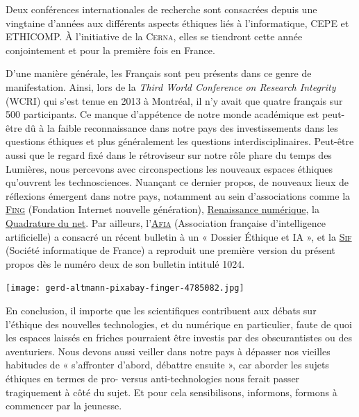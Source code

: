 Deux conférences internationales de recherche sont consacrées depuis une vingtaine d’années aux différents aspects éthiques liés à l’informatique, CEPE et ETHICOMP. À l’initiative de la \textsc{Cerna}, elles se tiendront cette année conjointement et pour la première fois en France.

D’une manière générale, les Français sont peu présents dans ce genre de manifestation. Ainsi, lors de la \textit{Third World Conference on Research Integrity} (WCRI) qui s’est tenue en 2013 à Montréal, il n’y avait que quatre français sur 500 participants. Ce manque d’appétence de notre monde académique est peut-être dû à la faible reconnaissance dans notre pays des investissements dans les questions éthiques et plus généralement les questions interdisciplinaires. Peut-être aussi que le regard fixé dans le rétroviseur sur notre rôle phare du temps des Lumières, nous percevons avec circonspections les nouveaux espaces éthiques qu’ouvrent les technosciences. Nuançant ce dernier propos, de nouveaux lieux de réflexions émergent dans notre pays, notamment au sein d’associations comme la \href{https://fing.org/}{\textsc{Fing}} (Fondation Internet nouvelle génération), \href{https://www.renaissancenumerique.org/}{Renaissance numérique}, la \href{https://www.laquadrature.net/}{Quadrature du net}. Par ailleurs, l’\href{https://afia.asso.fr/}{\textsc{Afia}} (Association française d’intelligence artificielle) a consacré un récent bulletin à un « Dossier Éthique et IA », et la \href{https://www.societe-informatique-de-france.fr/}{\textsc{Sif}} (Société informatique de France) a reproduit une première version du présent propos dès le numéro deux de son bulletin intitulé 1024.

\begin{jazzgraphic*}
\texttt{[image: gerd-altmann-pixabay-finger-4785082.jpg]}
\end{jazzgraphic*}

En conclusion, il importe que les scientifiques contribuent aux débats sur l’éthique des nouvelles technologies, et du numérique en particulier, faute de quoi les espaces laissés en friches pourraient être investis par des obscurantistes ou des aventuriers. Nous devons aussi veiller dans notre pays à dépasser nos vieilles habitudes de « s’affronter d’abord, débattre ensuite », car aborder les sujets éthiques en termes de pro- versus anti-technologies nous ferait passer tragiquement à côté du sujet. Et pour cela sensibilisons, informons, formons à commencer par la jeunesse.

